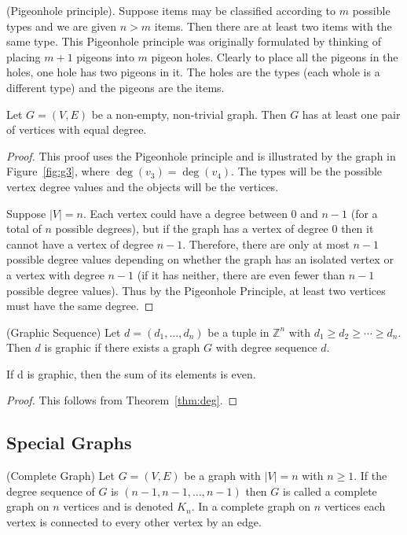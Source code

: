\begin{remark} (Pigeonhole principle).
Suppose items may be classified according to \(m\) possible types and we are given \(n> m\) items.
Then there are at least two items with the same type.
This Pigeonhole principle was originally formulated by thinking of placing \(m + 1\) pigeons into \(m\) pigeon holes.
Clearly to place all the pigeons in the holes, one hole has two pigeons in it.
The holes are the types (each whole is a different type) and the pigeons are the items.

\end{remark}
%
\begin{theorem}
Let \(G = (V, E)\) be a non-empty, non-trivial graph.
Then \(G\) has at least one pair of vertices with equal degree.
\end{theorem}
%
\begin{proof}
This proof uses the Pigeonhole principle and is illustrated by the graph in Figure~\ref{fig:g3}, where \(\deg(v_3) = \deg(v_4)\).
The types will be the possible vertex degree values and the objects will be the vertices.

Suppose  \(|V| = n\).
Each vertex could have a degree between \(0\) and \(n-1\) (for a total of \(n\) possible degrees), but if the graph has a vertex of degree \(0\) then it cannot have a vertex of degree \(n-1\).
Therefore, there are only at most \(n-1\) possible degree values depending on whether the graph has an isolated vertex or a vertex with degree \(n-1\) (if it has neither, there are even fewer than \(n-1\) possible degree values).
Thus by the Pigeonhole Principle, at least two vertices must have the same degree.
\end{proof}
%
\begin{definition}{(Graphic Sequence)}
Let \(d = (d_1, \ldots, d_n)\) be a tuple in \(\mathbb{Z}^n\) with \(d_1 \geq d_2 \geq \cdots \geq d_n\).
Then \(d\) is graphic if there exists a graph \(G\) with degree sequence \(d\).
\end{definition}
%
\begin{corollary}
If d is graphic, then the sum of its elements is even.
\end{corollary}
%
\begin{proof}
This follows from Theorem~\ref{thm:deg}.
\end{proof}
%


\subsection{Special Graphs}
\begin{definition} {(Complete Graph)}
Let \(G = (V,E)\) be a graph with \(|V| = n\) with \(n \geq 1\).
If the degree sequence of \(G\) is \((n-1,n-1,\dots,n-1) \) then \(G\) is called a complete graph on \(n\) vertices and is denoted \(K_n\).
In a complete graph on \(n\) vertices each vertex is connected to every other vertex by an edge.
\end{definition}

